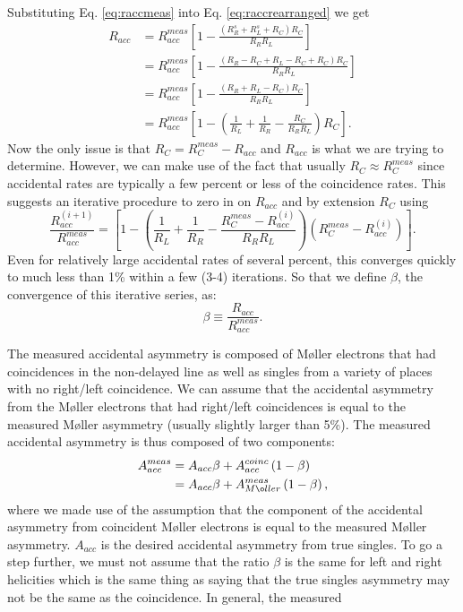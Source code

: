 \documentclass[12pt]{article}
\begin{document}
Substituting Eq. \ref{eq:raccmeas} into Eq. \ref{eq:raccrearranged} we get
\begin{align}
R_{acc}&=R_{acc}^{meas}\left[ 1-\frac{(R_R^s+R_L^s+R_C)R_C}{R_RR_L}\right]\\
             &=R_{acc}^{meas}\left[ 1- \frac{(R_R-R_C+R_L-R_C+R_C)R_C}{R_RR_L}\right]\\
             &=R_{acc}^{meas}\left[ 1- \frac{(R_R+R_L-R_C)R_C}{R_RR_L}\right]\\
             &=R_{acc}^{meas}\left[1-\left(\frac{1}{R_L}+ \frac{1}{R_R} - \frac{R_C}{R_RR_L}\right)R_C\right]\label{eq:beta}.
\end{align}
Now the only issue is that $R_C=R_C^{meas}-R_{acc}$ and $R_{acc}$ is what we are trying to determine. However, we can make use of the fact that usually $R_C\approx R_C^{meas}$ since accidental rates are typically a few percent or less of the coincidence rates. This suggests an iterative procedure to zero in on $R_{acc}$ and by extension $R_C$ using
\begin{equation}
\frac{R_{acc}^{(i+1)}}{R_{acc}^{meas}}=\left[1-\left(\frac{1}{R_L}+ \frac{1}{R_R} - \frac{R_C^{meas}-R_{acc}^{(i)}}{R_RR_L}\right)\left(R_C^{meas}-R_{acc}^{(i)}\right)\right].
\end{equation}
Even for relatively large accidental rates of several percent, this converges quickly to much less than 1\% within a few (3-4) iterations. So that we define $\beta$, the convergence of this iterative series, as:
\begin{equation}\label{eq:beta}
\beta\equiv\frac{R_{acc}}{R_{acc}^{meas}}.
\end{equation}

The measured accidental asymmetry is composed of M\o ller electrons that had coincidences in the non-delayed line as well as singles from a variety of places with no right/left coincidence.  We can assume that the accidental asymmetry from the M\o ller electrons that had right/left coincidences is equal to the measured M\o ller asymmetry (usually slightly larger than 5\%). The measured accidental asymmetry is thus composed of two components:
\begin{align}
A_{acc}^{meas}&=A_{acc}\beta+A_{acc}^{coinc}\left(1-\beta\right)\\
&=A_{acc}\beta+A_{M\o ller}^{meas}\left(1-\beta\right){\label{eq:Aacc}},
\end{align}
where we made use of the assumption that the component of the accidental asymmetry from coincident M\o ller electrons is equal to the measured M\o ller asymmetry. $A_{acc}$ is the desired accidental asymmetry from true singles.
To go a step further, we must not assume that the ratio $\beta$ is the same for left and right helicities which is the same thing as saying that the true singles asymmetry may not be the same as the coincidence. In general, the measured 
\end{document}
